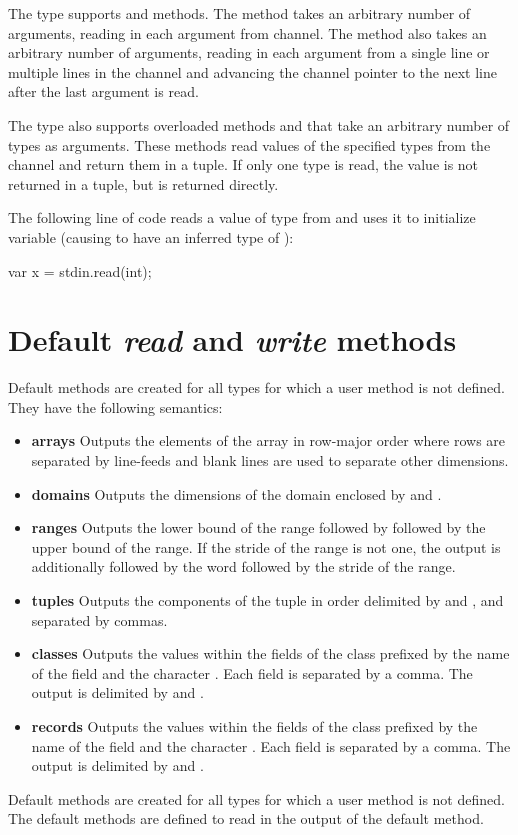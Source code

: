 The  type supports  and  methods.
The  method takes an arbitrary number of arguments, reading
in each argument from channel.  The  method also
takes an arbitrary number of arguments, reading in each argument
from a single line or multiple lines in the channel and 
advancing the channel pointer to the next line after the last argument 
is read.

The  type also supports overloaded methods 
and  that take an arbitrary number of types as arguments.
These methods read values of the specified types from the channel and
return them in a tuple.  If only one type is read, the value is not
returned in a tuple, but is returned directly.

\begin{example}
The following line of code reads a value of type  from
 and uses it to initialize variable  (causing
 to have an inferred type of ):
\begin{chapel}
var x = stdin.read(int);
\end{chapel}
\end{example}


\section{Default {\em read} and {\em write} methods}


Default  methods are created for all types for which a user
 method is not defined.  They have the following semantics:
\begin{itemize}
\item
{\bf arrays} Outputs the elements of the array in row-major order
where rows are separated by line-feeds and blank lines are used to
separate other dimensions.
\item
{\bf domains} Outputs the dimensions of the domain enclosed
by \chpl{[} and \chpl{]}.
\item
{\bf ranges} Outputs the lower bound of the range followed
by  followed by the upper bound of the range.  If the stride
of the range is not one, the output is additionally followed by the
word  followed by the stride of the range.
\item
{\bf tuples} Outputs the components of the tuple in order delimited
by \chpl{(} and \chpl{)}, and separated by commas.
\item
{\bf classes} Outputs the values within the fields of the class
prefixed by the name of the field and the character \chpl{=}.  Each
field is separated by a comma.  The output is delimited by \chpl{\{}
and \chpl{\}}.
\item
{\bf records} Outputs the values within the fields of the class
prefixed by the name of the field and the character \chpl{=}.  Each
field is separated by a comma.  The output is delimited by \chpl{(}
and \chpl{)}.
\end{itemize}

Default  methods are created for all types for which a user
 method is not defined.  The default  methods are
defined to read in the output of the default  method.
